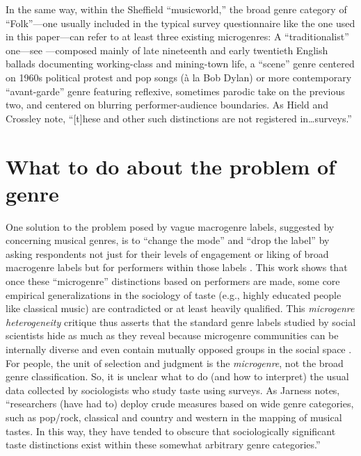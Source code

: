 \documentclass[a4paper,12pt]{extarticle}
\begin{document}
In the same way, within the Sheffield ``musicworld,'' the broad genre category of ``Folk''---one usually included in the typical survey questionnaire like the one used in this paper---can refer to at least three existing microgenres: A ``traditionalist'' one---see \citep{Lena2012}---composed mainly of late nineteenth and early twentieth English ballads documenting working-class and mining-town life, a ``scene'' genre centered on 1960s political protest and pop songs (\`{a} la Bob Dylan) or more contemporary ``avant-garde'' genre featuring reflexive, sometimes parodic take on the previous two, and centered on blurring performer-audience boundaries. As Hield and Crossley \citeyearpar[197]{Hield2014-xe} note, ``[t]hese and other such distinctions are not registered in\ldots surveys.''

\section{What to do about the problem of genre}
One solution to the problem posed by vague macrogenre labels, suggested by \citet{vlegels2015music, vlegels2017music} concerning musical genres, is to ``change the mode'' and ``drop the label'' by asking respondents not just for their levels of engagement or liking of broad macrogenre labels but for performers within those labels \citep{nault2021social}. This work shows that once these ``microgenre'' distinctions based on performers are made, some core empirical generalizations in the sociology of taste (e.g., highly educated people like classical music) are contradicted or at least heavily qualified. This \textit{microgenre heterogeneity} critique thus asserts that the standard genre labels studied by social scientists hide as much as they reveal because microgenre communities can be internally diverse and even contain mutually opposed groups in the social space \citep{flemmen_etal18}. For people, the unit of selection and judgment is the {\em microgenre}, not the broad genre classification. So, it is unclear what to do (and how to interpret) the usual data collected by sociologists who study taste using surveys. As Jarness \citeyearpar{jarness2015} notes, ``researchers (have had to) deploy crude measures based on wide genre categories, such as pop/rock, classical and country and western in the mapping of musical tastes. In this way, they have tended to obscure that sociologically significant taste distinctions exist within these somewhat arbitrary genre categories.''
\end{document}
